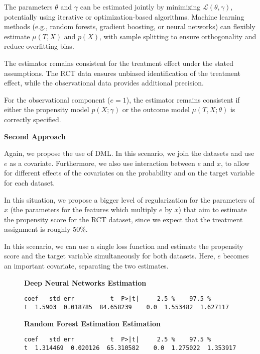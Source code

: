 \documentclass{article}
\begin{document}
The parameters \(\theta\) and \(\gamma\) can be estimated jointly by minimizing \(\mathcal{L}(\theta, \gamma)\), potentially using iterative or optimization-based algorithms. Machine learning methods (e.g., random forests, gradient boosting, or neural networks) can flexibly estimate \(\mu(T, X)\) and \(p(X)\), with sample splitting to ensure orthogonality and reduce overfitting bias.

The estimator remains consistent for the treatment effect under the stated assumptions. The RCT data ensures unbiased identification of the treatment effect, while the observational data provides additional precision.

For the observational component (\( e=1 \)), the estimator remains consistent if either the propensity model \( p(X; \gamma) \) or the outcome model \( \mu(T, X; \theta) \) is correctly specified.

\textbf{Second Approach}

Again, we propose the use of DML. In this scenario, we join the datasets and use $e$ as a covariate. Furthermore, we also use interaction between $e$ and $x$, to allow for different effects of the covariates on the probability and on the target variable for each dataset.

In this situation, we propose a bigger level of regularization for the parameters of $x$ (the parameters for the features which multiply $e$ by $x$) that aim to estimate the propensity score for the RCT dataset, since we expect that the treatment assignment is roughly 50\%.

In this scenario, we can use a single loss function and estimate the propensity score and the target variable simultaneously for both datasets. Here, $e$ becomes an important covariate, separating the two estimates.

\begin{figure}[H]
  \textbf{Deep Neural Networks Estimation}
  \begin{lstlisting}[style=RstyleComment, caption=ATE and Confidence Interval Estimates Ignoring Covariates]
coef   std err          t  P>|t|     2.5 %    97.5 %
t  1.5903  0.018785  84.658239    0.0  1.553482  1.627117
  \end{lstlisting}
\end{figure}

\begin{figure}[H]
  \textbf{Random Forest Estimation Estimation}
  \begin{lstlisting}[style=RstyleComment, caption=ATE and Confidence Interval Estimates Ignoring Covariates]
coef   std err          t  P>|t|     2.5 %    97.5 %
t  1.314469  0.020126  65.310582    0.0  1.275022  1.353917
\end{lstlisting}
\end{figure}
\end{document}
